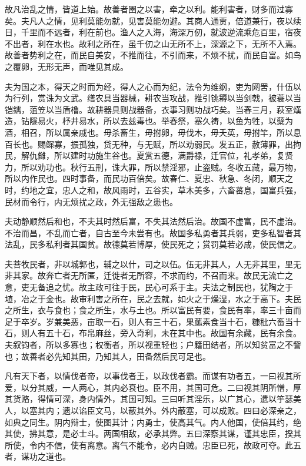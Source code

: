 \documentclass[]{article}
\begin{document}
故凡治乱之情，皆道上始。故善者圉之以害，牵之以利。能利害者，财多而过寡矣。夫凡人之情，见利莫能勿就，见害莫能勿避。其商人通贾，倍道兼行，夜以续日，千里而不远者，利在前也。渔人之入海，海深万仞，就波逆流乘危百里，宿夜不出者，利在水也。故利之所在，虽千仞之山无所不上，深源之下，无所不入焉。故善者势利之在，而民自美安，不推而往，不引而来，不烦不扰，而民自富。如鸟之覆卵，无形无声，而唯见其成。

夫为国之本，得天之时而为经，得人之心而为纪，法令为维纲，吏为网罟，什伍以为行列，赏诛为文武。缮农具当器械，耕农当攻战，推引铫耨以当剑戟，被蓑以当铠鑐，菹笠以当盾橹。故耕器具则战器备，衣事习则功战巧矣。当春三月，萩室熯造，钻隧易火，杼井易水，所以去兹毒也。举春祭，塞久祷，以鱼为牲，以糵为酒，相召，所以属亲戚也。毋杀畜生，毋拊卵，毋伐木，毋夭英，毋拊竿，所以息百长也。赐鳏寡，振孤独，贷无种，与无赋，所以劝弱民。发五正，赦薄罪，出拘民，解仇雠，所以建时功施生谷也。夏赏五德，满爵禄，迁官位，礼孝弟，复贤力，所以劝功也。秋行五刑，诛大罪，所以禁淫邪，止盗贼。冬收五藏，最万物，所以内作民也。四时事备，而民功百倍矣。故春仁、夏忠、秋急、冬闭，顺天之时，约地之宜，忠人之和，故风雨时，五谷实，草木美多，六畜蕃息，国富兵强，民材而令行，内无烦扰之政，外无强敌之患也。

夫动静顺然后和也，不夫其时然后富，不失其法然后治。故国不虚富，民不虚治。不治而昌，不乱而亡者，自古至今未尝有也。故国多私勇者其兵弱，吏多私智者其法乱，民多私利者其国贫。故德莫若博厚，使民死之；赏罚莫若必成，使民信之。

夫菩牧民者，非以城郭也，辅之以什，司之以伍。伍无非其人，人无非其里，里无非其家。故奔亡者无所匿，迁徙者无所容，不求而约，不召而来。故民无流亡之意，吏无备追之忧。故主政可往于民，民心可系于主。夫法之制民也，犹陶之于埴，冶之于金也。故审利害之所在，民之去就，如火之于燥湿，水之于高下。夫民之所生，衣与食也；食之所生，水与土也。所以富民有要，食民有率，率三十亩而足于卒岁。岁兼美恶，亩取一石，则人有三十石，果蓏素食当十石，糠秕六畜当十石，则人有五十石，布帛麻丝，旁入奇利，未在其中也。故国有余藏，民有余食。夫叙钧者，所以多寡也；权衡者，所以视重轻也；户籍田结者，所以知贫富之不訾也；故善者必先知其田，乃知其人，田备然后民可足也。

凡有天下者，以情伐者帝，以事伐者王，以政伐者霸。而谋有功者五，一曰视其所爱，以分其威，一人两心，其内必衰也。臣不用，其国可危。二曰视其阴所憎，厚其货赂，得情可深，身内情外，其国可知。三曰听其淫乐，以广其心，遗以竽瑟美人，以塞其内；遗以谄臣文马，以蔽其外。外内蔽塞，可以成败。四曰必深亲之，如典之同生。阴内辩士，使图其计；内勇士，使高其气。内人他国，使倍其约，绝其使，拂其意，是必士斗。两国相敌，必承其弊。五曰深察其谋，谨其忠臣，揆其所使，令内不信，使有离意。离气不能令，必内自贼。忠臣已死，故政可夺。此五者，谋功之道也。
\end{document}
